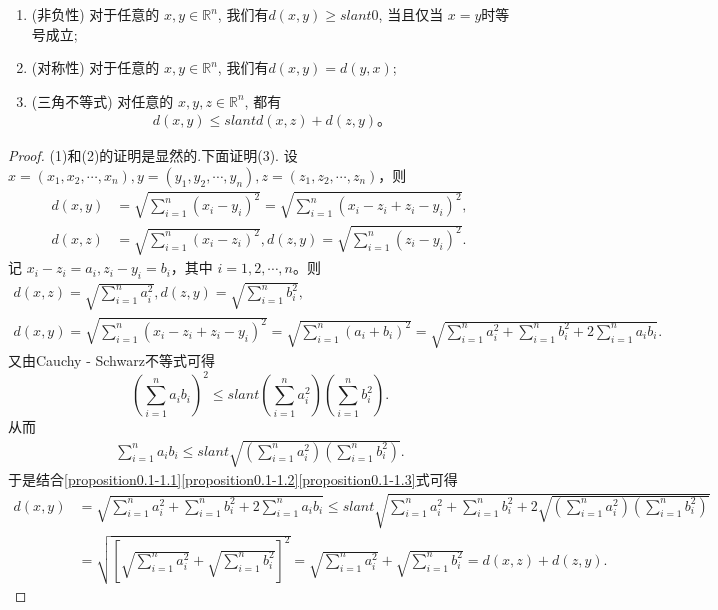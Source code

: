 \documentclass[../../main.tex]{subfiles}
\begin{document}
\begin{proposition}
\begin{enumerate}[(1)]
\item (非负性) 对于任意的 $x, y \in \mathbb{R}^n$, 我们有$d(x, y) \geqslant slant 0$, 当且仅当 $x = y$时等号成立;
\item (对称性) 对于任意的 $x, y \in \mathbb{R}^n$, 我们有$d(x, y) = d(y, x)$;
\item (三角不等式) 对任意的 $x, y, z \in \mathbb{R}^n$, 都有
\begin{align*}
d(x, y) \leqslant slant d(x, z) + d(z, y)。
\end{align*}
\end{enumerate}
\end{proposition}
\begin{proof}
(1)和(2)的证明是显然的.下面证明(3).
设 $x=(x_1,x_2,\cdots,x_n),y=(y_1,y_2,\cdots,y_n),z=(z_1,z_2,\cdots,z_n)$，则
\begin{align*}
d(x,y) &=\sqrt{\sum_{i = 1}^n (x_i - y_i)^2}=\sqrt{\sum_{i = 1}^n (x_i - z_i + z_i - y_i)^2},\\
d(x,z) &=\sqrt{\sum_{i = 1}^n (x_i - z_i)^2},d(z,y)=\sqrt{\sum_{i = 1}^n (z_i - y_i)^2}.
\end{align*}
记 $x_i - z_i = a_i,z_i - y_i = b_i$，其中 $i = 1,2,\cdots,n$。则
\begin{gather}
d(x,z) =\sqrt{\sum_{i = 1}^n a_{i}^{2}},d(z,y)=\sqrt{\sum_{i = 1}^n b_{i}^{2}},\label{proposition0.1-1.1}\\
d(x,y) =\sqrt{\sum_{i = 1}^n (x_i - z_i + z_i - y_i)^2}=\sqrt{\sum_{i = 1}^n (a_i + b_i)^2}=\sqrt{\sum_{i = 1}^n a_{i}^{2}+\sum_{i = 1}^n b_{i}^{2}+2\sum_{i = 1}^n a_ib_i}.\label{proposition0.1-1.2}
\end{gather}
又由Cauchy - Schwarz不等式可得
\[
(\sum_{i = 1}^n a_ib_i)^2\leqslant slant (\sum_{i = 1}^n a_{i}^{2})(\sum_{i = 1}^n b_{i}^{2}).
\]
从而
\begin{align}
\sum_{i = 1}^n a_ib_i\leqslant slant \sqrt{(\sum_{i = 1}^n a_{i}^{2})(\sum_{i = 1}^n b_{i}^{2})}.\label{proposition0.1-1.3}
\end{align}
于是结合\eqref{proposition0.1-1.1}\eqref{proposition0.1-1.2}\eqref{proposition0.1-1.3}式可得
\begin{align*}
d(x,y) &=\sqrt{\sum_{i = 1}^n a_{i}^{2}+\sum_{i = 1}^n b_{i}^{2}+2\sum_{i = 1}^n a_ib_i}\leqslant slant \sqrt{\sum_{i = 1}^n a_{i}^{2}+\sum_{i = 1}^n b_{i}^{2}+2\sqrt{(\sum_{i = 1}^n a_{i}^{2})(\sum_{i = 1}^n b_{i}^{2})}}\\
&=\sqrt{[\sqrt{\sum_{i = 1}^n a_{i}^{2}}+\sqrt{\sum_{i = 1}^n b_{i}^{2}}]^2}=\sqrt{\sum_{i = 1}^n a_{i}^{2}}+\sqrt{\sum_{i = 1}^n b_{i}^{2}}=d(x,z)+d(z,y).
\end{align*} 
\end{proof}
\end{document}
